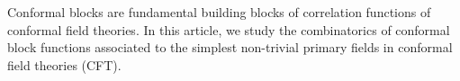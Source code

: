 \documentclass[oneside,english]{amsart}
\numberwithin{equation}{section}
\numberwithin{figure}{section}
\theoremstyle{plain}
\theoremstyle{plain}
\theoremstyle{plain}
\theoremstyle{remark}
\theoremstyle{plain}
\theoremstyle{plain}
\theoremstyle{plain}
\theoremstyle{plain}
\theoremstyle{plain}
\theoremstyle{plain}
\theoremstyle{plain}
\theoremstyle{plain}
\begin{document}
%
%
%
%


Conformal blocks are fundamental building blocks of correlation functions of conformal field theories.
In this article, we study the combinatorics of conformal block functions associated to 
the simplest non-trivial primary fields in conformal field theories (CFT).
\end{document}
